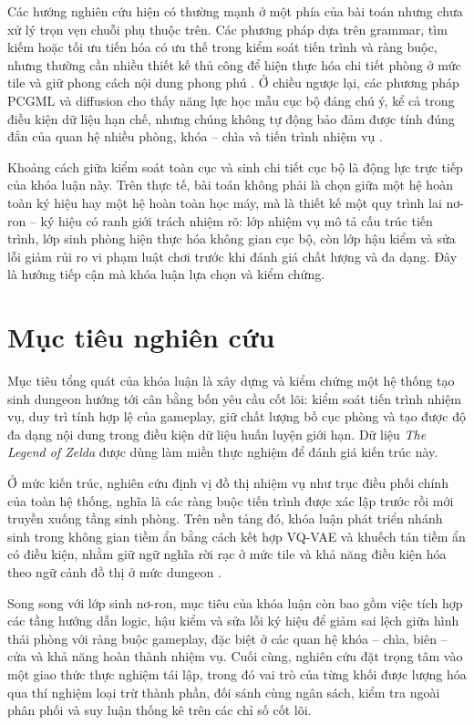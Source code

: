 \documentclass[oneside,a4paper,12pt]{extreport}
\begin{document}
Các hướng nghiên cứu hiện có thường mạnh ở một phía của bài toán nhưng chưa xử lý trọn vẹn chuỗi phụ thuộc trên. Các phương pháp dựa trên grammar, tìm kiếm hoặc tối ưu tiến hóa có ưu thế trong kiểm soát tiến trình và ràng buộc, nhưng thường cần nhiều thiết kế thủ công để hiện thực hóa chi tiết phòng ở mức tile và giữ phong cách nội dung phong phú \cite{togelius2011pcg,dormans2011missionspaces,mota2021dungeon}. Ở chiều ngược lại, các phương pháp PCGML và diffusion cho thấy năng lực học mẫu cục bộ đáng chú ý, kể cả trong điều kiện dữ liệu hạn chế, nhưng chúng không tự động bảo đảm được tính đúng đắn của quan hệ nhiều phòng, khóa -- chìa và tiến trình nhiệm vụ \cite{summerville2018pcgml,khalifa2020pcgrl,inoue2023layoutdm,shabani2023housediffusion,dai2024singleexample}.

Khoảng cách giữa kiểm soát toàn cục và sinh chi tiết cục bộ là động lực trực tiếp của khóa luận này. Trên thực tế, bài toán không phải là chọn giữa một hệ hoàn toàn ký hiệu hay một hệ hoàn toàn học máy, mà là thiết kế một quy trình lai nơ-ron -- ký hiệu có ranh giới trách nhiệm rõ: lớp nhiệm vụ mô tả cấu trúc tiến trình, lớp sinh phòng hiện thực hóa không gian cục bộ, còn lớp hậu kiểm và sửa lỗi giảm rủi ro vi phạm luật chơi trước khi đánh giá chất lượng và đa dạng. Đây là hướng tiếp cận mà khóa luận lựa chọn và kiểm chứng.

\section{Mục tiêu nghiên cứu}
Mục tiêu tổng quát của khóa luận là xây dựng và kiểm chứng một hệ thống tạo sinh dungeon hướng tới cân bằng bốn yêu cầu cốt lõi: kiểm soát tiến trình nhiệm vụ, duy trì tính hợp lệ của gameplay, giữ chất lượng bố cục phòng và tạo được độ đa dạng nội dung trong điều kiện dữ liệu huấn luyện giới hạn. Dữ liệu \textit{The Legend of Zelda} được dùng làm miền thực nghiệm để đánh giá kiến trúc này.

Ở mức kiến trúc, nghiên cứu định vị đồ thị nhiệm vụ như trục điều phối chính của toàn hệ thống, nghĩa là các ràng buộc tiến trình được xác lập trước rồi mới truyền xuống tầng sinh phòng. Trên nền tảng đó, khóa luận phát triển nhánh sinh trong không gian tiềm ẩn bằng cách kết hợp VQ-VAE và khuếch tán tiềm ẩn có điều kiện, nhằm giữ ngữ nghĩa rời rạc ở mức tile và khả năng điều kiện hóa theo ngữ cảnh đồ thị ở mức dungeon \cite{oord2017vqvae,ho2020ddpm,song2021ddim,rombach2022ldm}. 

Song song với lớp sinh nơ-ron, mục tiêu của khóa luận còn bao gồm việc tích hợp các tầng hướng dẫn logic, hậu kiểm và sửa lỗi ký hiệu để giảm sai lệch giữa hình thái phòng với ràng buộc gameplay, đặc biệt ở các quan hệ khóa -- chìa, biên -- cửa và khả năng hoàn thành nhiệm vụ. Cuối cùng, nghiên cứu đặt trọng tâm vào một giao thức thực nghiệm tái lập, trong đó vai trò của từng khối được lượng hóa qua thí nghiệm loại trừ thành phần, đối sánh cùng ngân sách, kiểm tra ngoài phân phối và suy luận thống kê trên các chỉ số cốt lõi.
\end{document}
